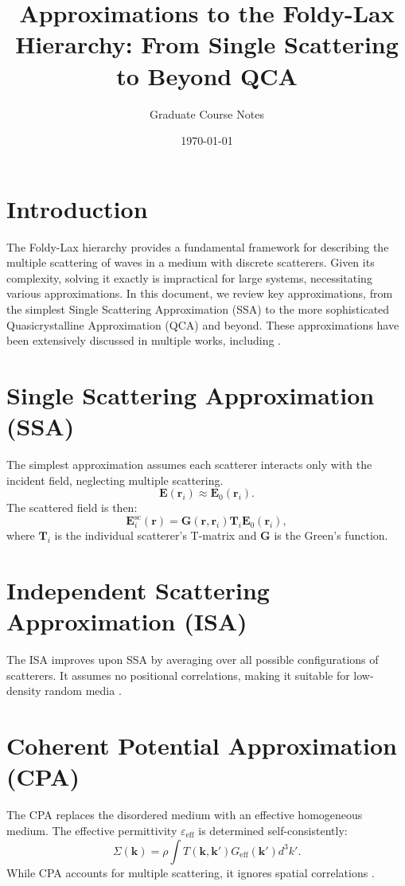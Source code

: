 \documentclass{article}
\begin{document}
	
	\title{Approximations to the Foldy-Lax Hierarchy: From Single Scattering to Beyond QCA}
	\author{Graduate Course Notes}
	\date{\today}
	\maketitle
	
	\section{Introduction}
	The Foldy-Lax hierarchy provides a fundamental framework for describing the multiple scattering of waves in a medium with discrete scatterers. Given its complexity, solving it exactly is impractical for large systems, necessitating various approximations. In this document, we review key approximations, from the simplest Single Scattering Approximation (SSA) to the more sophisticated Quasicrystalline Approximation (QCA) and beyond. These approximations have been extensively discussed in multiple works, including \cite{ishimaru1978wave, lagendijk1996resonant, tishkovets2011multiple, barrera1989coherent}.
	
	\section{Single Scattering Approximation (SSA)}
	The simplest approximation assumes each scatterer interacts only with the incident field, neglecting multiple scattering.
	\begin{equation}
		\mathbf{E}(\mathbf{r}_i) \approx \mathbf{E}_0(\mathbf{r}_i).
	\end{equation}
	The scattered field is then:
	\begin{equation}
		\mathbf{E}^{\text{sc}}_i(\mathbf{r}) = \mathbf{G}(\mathbf{r}, \mathbf{r}_i) \mathbf{T}_i \mathbf{E}_0(\mathbf{r}_i),
	\end{equation}
	where \( \mathbf{T}_i \) is the individual scatterer's T-matrix and \( \mathbf{G} \) is the Green's function.
	
	\section{Independent Scattering Approximation (ISA)}
	The ISA improves upon SSA by averaging over all possible configurations of scatterers. It assumes no positional correlations, making it suitable for low-density random media \cite{ishimaru1978wave}.
	
	\section{Coherent Potential Approximation (CPA)}
	The CPA replaces the disordered medium with an effective homogeneous medium. The effective permittivity \( \varepsilon_{\text{eff}} \) is determined self-consistently:
	\begin{equation}
		\Sigma(\mathbf{k}) = \rho \int T(\mathbf{k}, \mathbf{k'}) G_{\text{eff}}(\mathbf{k'}) d^3k'.
	\end{equation}
	While CPA accounts for multiple scattering, it ignores spatial correlations \cite{tishkovets2011multiple}.
	
\end{document}
